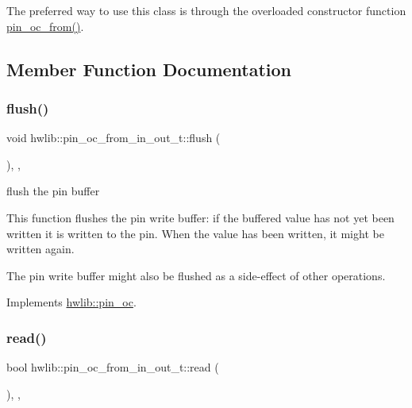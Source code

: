 The preferred way to use this class is through the overloaded constructor function \hyperlink{namespacehwlib_aa2c63efcb24f3d5124567356d8c8a804}{pin\+\_\+oc\+\_\+from()}. 

\subsection{Member Function Documentation}
\mbox{\label{classhwlib_1_1pin__oc__from__in__out__t_add08ce2c564c20a9aea9bac915123929}} 
\subsubsection{\texorpdfstring{flush()}{flush()}}
{\footnotesize\ttfamily void hwlib\+::pin\+\_\+oc\+\_\+from\+\_\+in\+\_\+out\+\_\+t\+::flush (\begin{DoxyParamCaption}{ }\end{DoxyParamCaption})\hspace{0.3cm}{\ttfamily [inline]}, {\ttfamily [override]}, {\ttfamily [virtual]}}





flush the pin buffer

This function flushes the pin write buffer\+: if the buffered value has not yet been written it is written to the pin. When the value has been written, it might be written again.

The pin write buffer might also be flushed as a side-\/effect of other operations. 

Implements \hyperlink{classhwlib_1_1pin__oc_a021036a4566c712e43250ddd28a85e54}{hwlib\+::pin\+\_\+oc}.

\mbox{\label{classhwlib_1_1pin__oc__from__in__out__t_ae1e2dcf630d637e8d31e9942f7323a2b}} 
\subsubsection{\texorpdfstring{read()}{read()}}
{\footnotesize\ttfamily bool hwlib\+::pin\+\_\+oc\+\_\+from\+\_\+in\+\_\+out\+\_\+t\+::read (\begin{DoxyParamCaption}{ }\end{DoxyParamCaption})\hspace{0.3cm}{\ttfamily [inline]}, {\ttfamily [override]}, {\ttfamily [virtual]}}





